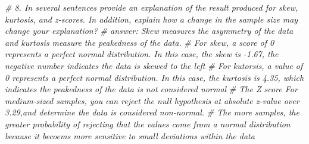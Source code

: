 \documentclass[
]{article}
\newenvironment{Shaded}{\begin{snugshade}}{\end{snugshade}}
\newcommand{\CommentTok}[1]{\textcolor[rgb]{0.56,0.35,0.01}{\textit{#1}}}
\begin{document}
\begin{Shaded}
\begin{Highlighting}[]
\CommentTok{# 8. In several sentences provide an explanation of the result produced for skew, kurtosis, and z-scores. In addition, explain how a change in the sample size may change your explanation?}
\CommentTok{#       answer: Skew measures the asymmetry of the data and kurtosis measure the peakedness of the data. }
\CommentTok{#       For skew, a score of 0 represents a perfect normal distribution. In this case, the skew is -1.67, the negative number indicates the data is skewed to the left}
\CommentTok{#       For kutorsis, a value of 0 represents a perfect normal distribution. In this case, the kurtosis is 4.35, which indicates the peakedness of the data is not considered normal}
\CommentTok{#       The Z score For medium-sized samples, you can reject the null hypothesis at absolute z-value over 3.29,and determine the data is considered non-normal.}
\CommentTok{#       The more samples, the greater probability of rejecting that the values come from a normal distribution because it becoems more sensitive to small deviations within the data}
\end{Highlighting}
\end{Shaded}
\end{document}
